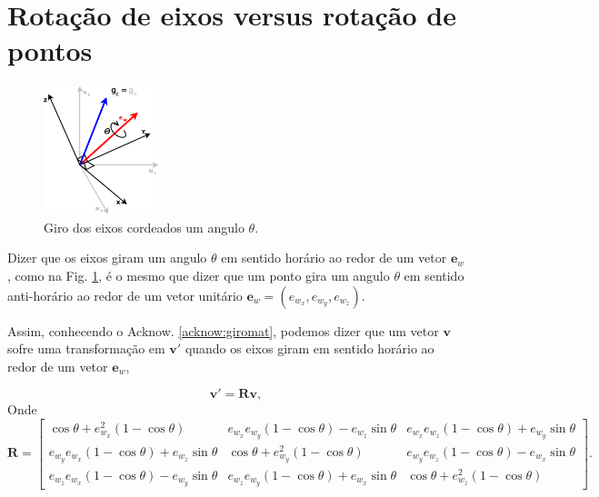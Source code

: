 \documentclass[a4paper,10pt]{report}
\begin{document}
\section{Rotação de eixos versus rotação de pontos }

\begin{figure}[h!]
\centering
  \includegraphics[width=0.3\textwidth]{images/girototal.eps} 
\caption{ Giro dos eixos cordeados um angulo $\theta$.}
\label{fig:girototal}
\end{figure}

\begin{theo}\label{theo:girovs}
 


 Dizer que os eixos giram um angulo $\theta$ em sentido horário ao redor de um 
 vetor $\mathbf{e}_w$, como na Fig. \ref{fig:girototal}, é o mesmo que dizer que um ponto gira um angulo $\theta$ 
 em sentido anti-horário ao redor de um  vetor unitário $\mathbf{e}_w=(e_{w_x},e_{w_y},e_{w_z})$. 
 
 Assim, conhecendo o Acknow. \ref{acknow:giromat}, podemos dizer
 que um vetor $\mathbf{v}$ 
 sofre uma transformação em $\mathbf{v}'$ quando os eixos giram em sentido 
 horário ao redor de um vetor $\mathbf{e}_w$,

 \begin{equation}
\mathbf{v}' = \mathbf{R} \mathbf{v} , 
\end{equation}
Onde
\begin{equation}
  \mathbf{R} = \begin{bmatrix} \cos \theta +e_{w_x}^2 \left(1-\cos \theta\right) & e_{w_x} e_{w_y} \left(1-\cos \theta\right) - e_{w_z} \sin \theta & e_{w_x} e_{w_z} \left(1-\cos \theta\right) + e_{w_y} \sin \theta \\ e_{w_y} e_{w_x} \left(1-\cos \theta\right) + e_{w_z} \sin \theta & \cos \theta + e_{w_y}^2\left(1-\cos \theta\right) & e_{w_y} e_{w_z} \left(1-\cos \theta\right) - e_{w_x} \sin \theta \\ e_{w_z} e_{w_x} \left(1-\cos \theta\right) - e_{w_y} \sin \theta & e_{w_z} e_{w_y} \left(1-\cos \theta\right) + e_{w_x} \sin \theta & \cos \theta + e_{w_z}^2\left(1-\cos \theta\right) \end{bmatrix}. 
\end{equation}
\end{theo}
\end{document}
